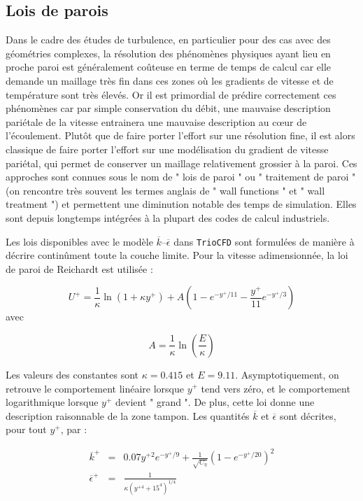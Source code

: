 \subsection{Lois de parois}

Dans le cadre des \'etudes de turbulence, en particulier pour des cas
avec des g\'eom\'etries complexes, la r\'esolution des ph\'enom\`enes physiques
ayant lieu en proche paroi est g\'en\'eralement co\^uteuse en terme de temps
de calcul car elle demande un maillage tr\`es fin dans ces zones o\`u
les gradients de vitesse et de temp\'erature sont tr\`es \'elev\'es. Or il
est primordial de pr\'edire correctement ces ph\'enom\`enes car par simple
conservation du d\'ebit, une mauvaise description pari\'etale de la vitesse
entrainera une mauvaise description au c\oe ur de l\textquoteright \'ecoulement.
Plut\^ot que de faire porter l\textquoteright effort sur une r\'esolution
fine, il est alors classique de faire porter l\textquoteright effort
sur une mod\'elisation du gradient de vitesse pari\'etal, qui permet de
conserver un maillage relativement grossier \`a la paroi. Ces approches
sont connues sous le nom de " lois de paroi " ou " traitement de paroi
" (on rencontre tr\`es souvent les termes anglais de " wall functions
" et " wall treatment ") et permettent une diminution notable des
temps de simulation. Elles sont depuis longtemps int\'egr\'ees \`a la plupart
des codes de calcul industriels.

Les lois disponibles avec le mod\`ele $\overline{k}$--$\overline{\epsilon}$
dans \texttt{TrioCFD} sont formul\'ees de mani\`ere \`a d\'ecrire contin\^ument
toute la couche limite. Pour la vitesse adimensionn\'ee, la loi de paroi
de Reichardt est utilis\'ee \cite{Reichardt1940} :

\[
U^{+}=\frac{1}{\kappa}\ln(1+\kappa y^{+})+A\left(1-e^{-y^{+}/11}-\frac{y^{+}}{11}e^{-y^{+}/3}\right)
\]
avec

\[
A=\frac{1}{\kappa}\ln\left(\frac{E}{\kappa}\right)
\]


Les valeurs des constantes sont $\kappa=0.415$ et $E=9.11$. Asymptotiquement,
on retrouve le comportement lin\'eaire lorsque $y^{+}$ tend vers z\'ero,
et le comportement logarithmique lorsque $y^{+}$ devient " grand
". De plus, cette loi donne une description raisonnable de la zone
tampon. Les quantit\'es $\overline{k}$ et $\overline{\epsilon}$ sont
d\'ecrites, pour tout $y^{+}$, par :

\begin{eqnarray*}
\overline{k}^{+} & = & 0.07y^{+2}e^{-y^{+}/9}+\frac{1}{\sqrt{C_{\eta}}}\left(1-e^{-y^{+}/20}\right)^{2}\\
\overline{\epsilon}^{+} & = & \frac{1}{\kappa(y^{+4}+15^{4})^{1/4}}
\end{eqnarray*}


